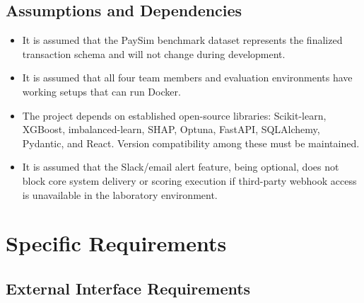 \documentclass[12pt, a4paper]{report}
\begin{document}
\section{Assumptions and Dependencies}
\begin{itemize}
    \item It is assumed that the PaySim benchmark dataset represents the finalized transaction schema and will not change during development.
    \item It is assumed that all four team members and evaluation environments have working setups that can run Docker.
    \item The project depends on established open-source libraries: Scikit-learn, XGBoost, imbalanced-learn, SHAP, Optuna, FastAPI, SQLAlchemy, Pydantic, and React. Version compatibility among these must be maintained.
    \item It is assumed that the Slack/email alert feature, being optional, does not block core system delivery or scoring execution if third-party webhook access is unavailable in the laboratory environment.
\end{itemize}

\newpage

\chapter{Specific Requirements}

\section{External Interface Requirements}
\end{document}

